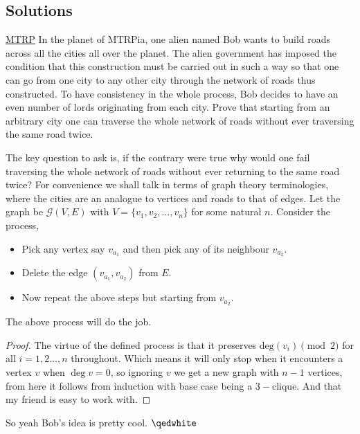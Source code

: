 \subsection{Solutions}
\begin{problem}{1}{\href{https://artofproblemsolving.com/community/c6h3281174p34327473}{MTRP}}
	In the planet of MTRPia, one alien named Bob wants to build roads across all the cities all over the planet. The alien government has imposed the condition that this construction must be carried out in such a way so that one can go from one city to any other city through the network of roads thus constructed. To have consistency in the whole process, Bob decides to have an even number of lords originating from each city. Prove that starting from an arbitrary city one can traverse the whole network of roads without ever traversing the same road twice.
	\begin{solution} The key question to ask is, if the contrary were true why would one fail traversing the whole network of roads without ever returning to the same road twice? For convenience we shall talk in terms of graph theory terminologies, where the cities are an analogue to vertices and roads to that of edges. Let the graph be $\mathcal{G}(V,E)$ with $V=\{v_1,v_2,\ldots,v_n\}$ for some natural $n$. Consider the process,
	\begin{itemize}
		\item Pick any vertex say $v_{a_1}$ and then pick any of its neighbour $v_{a_2}$.
		\item Delete the edge $(v_{a_1}, v_{a_2})$ from $E$.
		\item Now repeat the above steps but starting from $v_{a_2}$.
	\end{itemize}
	\begin{claim} 
		The above process will do the job.
	\end{claim}
	\begin{proof} 
	The virtue of the defined process is that it preserves $\text{deg}(v_i)\pmod{2}$ for all $i=1,2\ldots, n$ throughout. Which means it will only stop when it encounters a vertex $v$ when $\deg{v}=0$, so ignoring $v$ we get a new graph with $n-1$ vertices, from here it follows from induction with base case being a $3-$clique. And that my friend is easy to work with.
	\end{proof}
	
	\noindent So yeah Bob's idea is pretty cool. $\qedwhite$

	\end{solution}
\end{problem}

